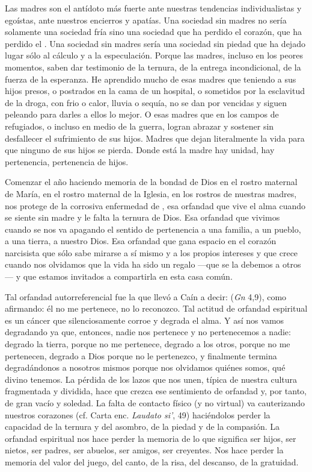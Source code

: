 \begin{body}
\begin{body}
Las madres son el antídoto más fuerte ante nuestras tendencias individualistas y egoístas, ante nuestros encierros y apatías. Una sociedad sin madres no sería solamente una sociedad fría sino una sociedad que ha perdido el corazón, que ha perdido el . Una sociedad sin madres sería una sociedad sin piedad que ha dejado lugar sólo al cálculo y a la especulación. Porque las madres, incluso en los peores momentos, saben dar testimonio de la ternura, de la entrega incondicional, de la fuerza de la esperanza. He aprendido mucho de esas madres que teniendo a sus hijos presos, o postrados en la cama de un hospital, o sometidos por la esclavitud de la droga, con frio o calor, lluvia o sequía, no se dan por vencidas y siguen peleando para darles a ellos lo mejor. O esas madres que en los campos de refugiados, o incluso en medio de la guerra, logran abrazar y sostener sin desfallecer el sufrimiento de sus hijos. Madres que dejan literalmente la vida para que ninguno de sus hijos se pierda. Donde está la madre hay unidad, hay pertenencia, pertenencia de hijos.

Comenzar el año haciendo memoria de la bondad de Dios en el rostro maternal de María, en el rostro maternal de la Iglesia, en los rostros de nuestras madres, nos protege de la corrosiva enfermedad de , esa orfandad que vive el alma cuando se siente sin madre y le falta la ternura de Dios. Esa orfandad que vivimos cuando se nos va apagando el sentido de pertenencia a una familia, a un pueblo, a una tierra, a nuestro Dios. Esa orfandad que gana espacio en el corazón narcisista que sólo sabe mirarse a sí mismo y a los propios intereses y que crece cuando nos olvidamos que la vida ha sido un regalo ---que se la debemos a otros--- y que estamos invitados a compartirla en esta casa común.

Tal orfandad autorreferencial fue la que llevó a Caín a decir:  (\emph{Gn} 4,9), como afirmando: él no me pertenece, no lo reconozco. Tal actitud de orfandad espiritual es un cáncer que silenciosamente corroe y degrada el alma. Y así nos vamos degradando ya que, entonces, nadie nos pertenece y no pertenecemos a nadie: degrado la tierra, porque no me pertenece, degrado a los otros, porque no me pertenecen, degrado a Dios porque no le pertenezco, y finalmente termina degradándonos a nosotros mismos porque nos olvidamos quiénes somos, qué  divino tenemos. La pérdida de los lazos que nos unen, típica de nuestra cultura fragmentada y dividida, hace que crezca ese sentimiento de orfandad y, por tanto, de gran vacío y soledad. La falta de contacto físico (y no virtual) va cauterizando nuestros corazones (cf. Carta enc. \emph{Laudato si'}, 49) haciéndolos perder la capacidad de la ternura y del asombro, de la piedad y de la compasión. La orfandad espiritual nos hace perder la memoria de lo que significa ser hijos, ser nietos, ser padres, ser abuelos, ser amigos, ser creyentes. Nos hace perder la memoria del valor del juego, del canto, de la risa, del descanso, de la gratuidad.


\end{body}
\end{body}
